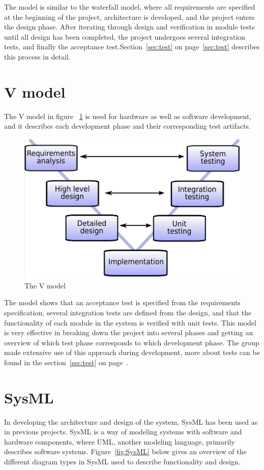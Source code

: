 The model is similar to the waterfall model, where all requirements are specified at the beginning of the project, architecture is developed, and the project enters the design phase. After iterating through design and verification in module tests until all design has been completed, the project undergoes several integration tests, and finally the acceptance test.Section~\ref{sec:test} on page~\ref{sec:test} describes this process in detail.

\section{V model}
The V model in figure ~\ref{fig:V_model} is used for hardware as well as software development, and it describes each development phase and their corresponding test artifacts. 

\begin{figure}[H]
	\centering
	\includegraphics[max width=0.7\linewidth]{V_model.png}
	\caption{The V model}
	\label{fig:V_model}
\end{figure}

The model shows that an acceptance test is specified from the requirements specification, several integration tests are defined from the design, and that the functionality of each module in the system is verified with unit tests. This model is very effective in breaking down the project into several phases and getting an overview of which test phase corresponds to which development phase. The group made extensive use of this approach during development, more about tests can be found in the section~\ref{sec:test} on page~\pageref{sec:test}.

\section{SysML}

In developing the architecture and design of the system, SysML has been used as in previous projects. SysML is a way of modeling systems with software and hardware components, where UML, another modeling language, primarily describes software systems. Figure~\ref{fig:SysML} below gives an overview of the different diagram types in SysML used to describe functionality and design.

